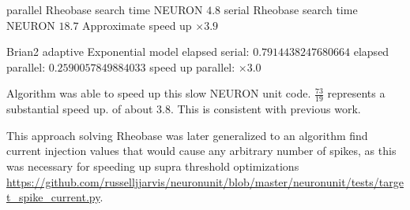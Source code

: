 parallel Rheobase search time NEURON  $4.8$
serial Rheobase search time NEURON  $18.7$
Approximate speed up $\times 3.9$

Brian2 adaptive Exponential model   
elapsed serial:  $0.7914438247680664$
elapsed parallel: $ 0.2590057849884033$
speed up parallel:   $\times 3.0$

Algorithm was able to speed up this slow NEURON unit code. $ \frac{73}{19} $ represents a substantial speed up. of about 3.8. This is consistent with previous work.

This approach solving Rheobase was later generalized to an algorithm find current injection values that would cause any arbitrary number of spikes, as this was necessary for speeding up supra threshold optimizations \url{https://github.com/russelljjarvis/neuronunit/blob/master/neuronunit/tests/target_spike_current.py}.

 